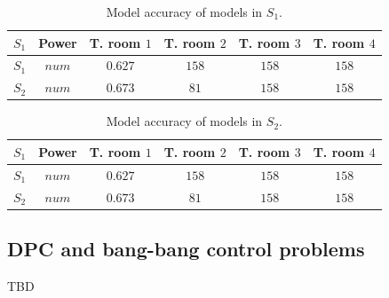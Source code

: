 \begin{table}[h!]
	\centering
	\caption{Model accuracy of models in $S_1$.}
	\captionsetup{justification=centering}
	\begin{tabular}{c|c|c|c|c|c}
		\toprule
		$S_1$     & Power & T. room $1$ & T. room $2$ & T. room $3$ & T. room $4$  \\ 
		\midrule
			$S_1$ & $num$ & $0.627$        & $158$          & $158$           & $158$\\
			$S_2$ & $num$ & $0.673$        & $81$           & $158$           & $158$\\
		\bottomrule
	\end{tabular}
	\label{T:S1accuracy}
\end{table}

\begin{table}[h!]
	\centering
	\caption{Model accuracy of models in $S_2$.}
	\captionsetup{justification=centering}
	\begin{tabular}{c|c|c|c|c|c}
		\toprule
		$S_1$     & Power & T. room $1$ & T. room $2$ & T. room $3$ & T. room $4$  \\ 
		\midrule
		$S_1$ & $num$ & $0.627$        & $158$          & $158$           & $158$\\
		$S_2$ & $num$ & $0.673$        & $81$           & $158$           & $158$\\
		\bottomrule
	\end{tabular}
	\label{T:S2accuracy}
\end{table}


\subsection{DPC and bang-bang control problems} TBD

